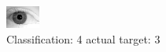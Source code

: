 \begin{figure}[h!]
\begin{center}
\includegraphics[width=0.60\columnwidth]{figures/ID2176_class_4_target_3.png}
\end{center}
\caption{ Classification: 4 actual target: 3}
\label{fig:ID2176_class_4_target_3}
\end{figure}
